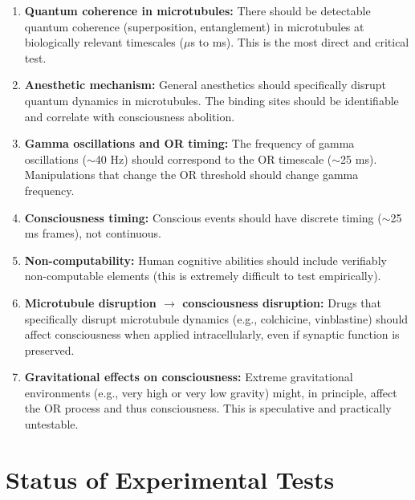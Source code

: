 \documentclass[11pt,a4paper]{report}
\begin{document}
\begin{predbox}
\begin{enumerate}[leftmargin=1.5em]
  \item \textbf{Quantum coherence in microtubules:} There should be detectable quantum coherence (superposition, entanglement) in microtubules at biologically relevant timescales ($\mu$s to ms). This is the most direct and critical test.
  \item \textbf{Anesthetic mechanism:} General anesthetics should specifically disrupt quantum dynamics in microtubules. The binding sites should be identifiable and correlate with consciousness abolition.
  \item \textbf{Gamma oscillations and OR timing:} The frequency of gamma oscillations ($\sim$40 Hz) should correspond to the OR timescale ($\sim$25 ms). Manipulations that change the OR threshold should change gamma frequency.
  \item \textbf{Consciousness timing:} Conscious events should have discrete timing ($\sim$25 ms frames), not continuous.
  \item \textbf{Non-computability:} Human cognitive abilities should include verifiably non-computable elements (this is extremely difficult to test empirically).
  \item \textbf{Microtubule disruption $\to$ consciousness disruption:} Drugs that specifically disrupt microtubule dynamics (e.g., colchicine, vinblastine) should affect consciousness when applied intracellularly, even if synaptic function is preserved.
  \item \textbf{Gravitational effects on consciousness:} Extreme gravitational environments (e.g., very high or very low gravity) might, in principle, affect the OR process and thus consciousness. This is speculative and practically untestable.
\end{enumerate}
\end{predbox}

\section{Status of Experimental Tests}
\end{document}
